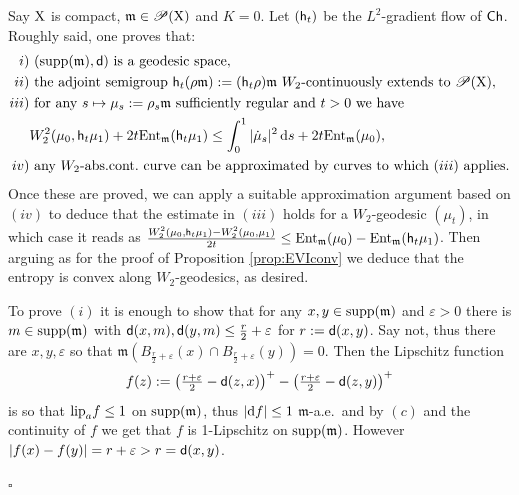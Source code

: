 \documentclass[11pt]{article}
\numberwithin{equation}{section}
\newenvironment{idea}{\removelastskip\par\medskip   %
\noindent{\em Idea of the proof} \rm}{\penalty-20\null\hfill$\square$\par\medbreak}
\newcommand{\pr}{\mathscr P}
\newcommand{\X}{{\rm X}}
\newcommand{\sfd}{{\sf d}}
\newcommand{\mm}{{\mathfrak m}}
\newcommand{\ch}{{\sf Ch}}
\newcommand{\ent}{{\rm Ent}_\mm}
\renewcommand{\d}{{\rm d}}
\newcommand{\lipa}{{\rm lip}_a}
\newcommand{\supp}{{\rm supp}}
\newcommand{\eps}{\varepsilon}
\newcommand{\h}{{\sf h}} %
\begin{document}
\begin{idea} Say $\X$ is compact, $\mm\in\pr(\X)$ and $K=0$. Let $(\h_t)$ be the $L^2$-gradient flow of $\ch$.  Roughly said, one proves that:
\begin{subequations}
\begin{align}
i)&\text{ $(\supp(\mm),\sfd)$ is a geodesic space},\\
ii)&\text{ the adjoint semigroup $\h_t(\rho\mm):=(\h_t\rho)\mm$ $W_2$-continuously extends to $\pr(\X)$},\\
iii)&
\text{ for any $s\mapsto\mu_s:=\rho_s\mm$ sufficiently regular and $t>0$ we have }\\
\label{eq:acest}&\text{$W_2^2(\mu_0,\h_t\mu_1)+2t\ent(\h_t\mu_1)\leq\int_0^1|\dot\mu_s|^2\,\d s+2t\ent(\mu_0)$,}\\
iv)&\text{ any $W_2$-abs.cont.\ curve can be approximated by curves to which $(iii)$ applies.}
\end{align}
\end{subequations}
Once these are proved, we can apply a suitable approximation argument based on $(iv)$  to deduce that the estimate in $(iii)$  holds for a $W_2$-geodesic $(\mu_t)$, in which case it reads as   $\frac{W_2^2(\mu_0,\h_t\mu_1)-W_2^2(\mu_0,\mu_1)}{2t}\leq \ent(\mu_0)-\ent(\h_t\mu_1)$. Then arguing as for the proof of Proposition \ref{prop:EVIconv} we deduce that the entropy is convex along $W_2$-geodesics, as desired.



To prove $(i)$  it is enough to show that for any $x,y\in\supp(\mm)$ and $\eps>0$ there is $m\in\supp(\mm)$ with $\sfd(x,m),\sfd(y,m)\leq\frac{r}2+\eps$ for $r:=\sfd(x,y)$. Say not, thus there are $x,y,\eps$ so that $\mm(B_{\frac{r}2+\eps}(x)\cap B_{\frac{r}2+\eps}(y))=0$. Then the Lipschitz function 
\[
f(z):=\big(\tfrac{r+\eps}2-\sfd(z,x)\big)^+-\big(\tfrac{r+\eps}2-\sfd(z,y)\big)^+
\]
is so that $\lipa f\leq 1$ on $\supp(\mm)$, thus $|\d f|\leq 1$ $\mm$-a.e.\ and by $(c)$ and the continuity of $f$ we get that $f$ is 1-Lipschitz on $\supp(\mm)$. However $|f(x)-f(y)|=r+\eps>r=\sfd(x,y)$.


\end{idea}
\end{document}
